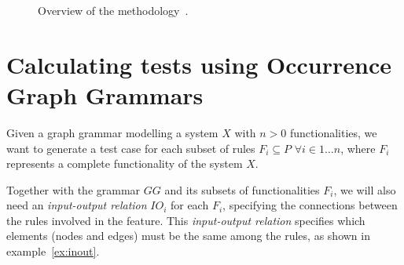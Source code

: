 \begin{figure}[!ht]
  \centering
  \caption{Overview of the methodology~\cite{Junior2015}.}\label{fig:tests:methodology}
\end{figure}

\section{Calculating tests using Occurrence Graph Grammars}

Given a graph grammar \graphGrammar{} modelling a system $X$ with $n > 0$ functionalities, we want to generate a test case for each subset of rules $F_i \subseteq P$ $\forall i \in 1\ldots n$, where $F_i$ represents a complete functionality  of the system $X$.

Together with the grammar $GG$ and its subsets of functionalities $F_i$, we will also need an \emph{input-output relation} $IO_i$ for each $F_i$, specifying the connections between the rules involved in the feature. This \emph{input-output relation} specifies which elements (nodes and edges) must be the same among the rules, as shown in example~\ref{ex:inout}.


